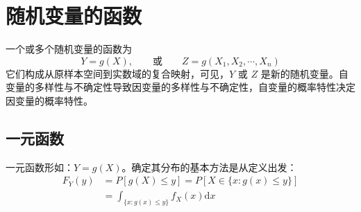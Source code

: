 \documentclass[11pt,openany,UTF8]{ctexbook}
\newcommand{\dif}{\mathrm{d}}                      %
\begin{document}
\section{随机变量的函数}

一个或多个随机变量的函数为
\[
Y=g(X),\qquad\text{或}\qquad Z=g(X_1,X_2,\cdots,X_n)
\]
它们构成从原样本空间到实数域的复合映射\nobreak，可见\nobreak，$Y$ 或 $Z$ 是新的随机变量\nobreak。自变量的多样性与不确定性导致因变量的多样性与不确定性\nobreak，自变量的概率特性决定因变量的概率特性\nobreak。

\subsection{一元函数}

一元函数形如\nobreak：$Y=g(X)$\nobreak。确定其分布的基本方法是从定义出发\nobreak：
\begin{equation}
\begin{aligned}
F_Y(y)&=P[g(X)\leqslant y]=P[X\in\{x:g(x)\leqslant y\}]\\
&=\int_{\{x:g(x)\leqslant y\}}f_X(x)\dif x
\end{aligned}
\label{eq:1.26}
\end{equation}
\end{document}
